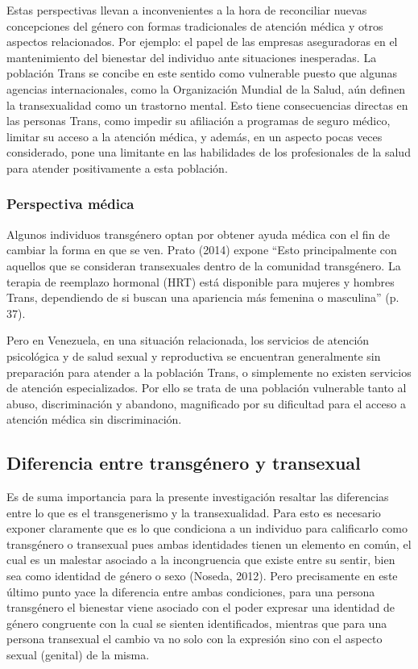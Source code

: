 Estas perspectivas llevan a inconvenientes a la hora de reconciliar nuevas
concepciones del género con formas tradicionales de atención médica y otros
aspectos relacionados.
Por ejemplo: el papel de las empresas aseguradoras en el mantenimiento del
bienestar del individuo ante situaciones inesperadas.
La población Trans se concibe en este sentido como vulnerable puesto que algunas
agencias internacionales, como la Organización Mundial de la Salud, aún definen
la transexualidad como un trastorno mental.
Esto tiene consecuencias directas en las personas Trans, como impedir su
afiliación a programas de seguro médico, limitar su acceso a la atención médica,
y además, en un aspecto pocas veces considerado, pone una limitante en las
habilidades de los profesionales de la salud para atender positivamente a esta
población.

\subsubsection{Perspectiva médica}
Algunos individuos transgénero optan por obtener ayuda médica con el fin de
cambiar la forma en que se ven.
Prato (2014) expone “Esto principalmente con aquellos que se consideran
transexuales dentro de la comunidad transgénero.
La terapia de reemplazo hormonal (HRT) está disponible para mujeres y hombres
Trans, dependiendo de si buscan una apariencia más femenina o masculina” (p.
37).

Pero en Venezuela, en una situación relacionada, los servicios de atención
psicológica y de salud sexual y reproductiva se encuentran generalmente sin
preparación para atender a la población Trans, o simplemente no existen
servicios de atención especializados.
Por ello se trata de una población vulnerable tanto al abuso, discriminación y
abandono, magnificado por su dificultad para el acceso a atención médica sin
discriminación.

\subsection{Diferencia entre transgénero y transexual}\label{diferencia}
Es de suma importancia para la presente investigación resaltar las diferencias
entre lo que es el transgenerismo y la transexualidad.
Para esto es necesario exponer claramente que es lo que condiciona a un
individuo para calificarlo como transgénero o transexual pues ambas identidades
tienen un elemento en común, el cual es un malestar asociado a la incongruencia
que existe entre su sentir, bien sea como identidad de género o sexo (Noseda,
2012).
Pero precisamente en este último punto yace la diferencia entre ambas
condiciones, para una persona transgénero el bienestar viene asociado con el
poder expresar una identidad de género congruente con la cual se sienten
identificados, mientras que para una persona transexual el cambio va no solo con
la expresión sino con el aspecto sexual (genital) de la misma.

